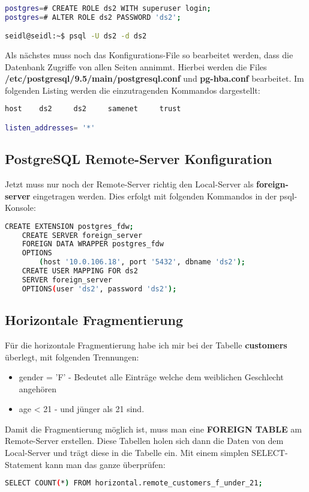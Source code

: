 \begin{lstlisting}[language=bash,caption={User, Rechte anlegen}]

postgres=# CREATE ROLE ds2 WITH superuser login;
postgres=# ALTER ROLE ds2 PASSWORD 'ds2';

seidl@seidl:~$ psql -U ds2 -d ds2
\end{lstlisting}

\newpage
Als nächstes muss noch das Konfigurations-File so bearbeitet werden, dass die Datenbank Zugriffe von allen Seiten annimmt.
Hierbei werden die Files \textbf{/etc/postgresql/9.5/main/postgresql.conf} und \textbf{pg-hba.conf} bearbeitet.
Im folgenden Listing werden die einzutragenden Kommandos dargestellt:
\begin{lstlisting}[language=bash,caption={PostgreSQL Konfiguration}]
host	ds2		ds2		samenet		trust

listen_addresses= '*'
\end{lstlisting}

\subsection{PostgreSQL Remote-Server Konfiguration}
Jetzt muss nur noch der Remote-Server richtig den Local-Server als \textbf{foreign-server} eingetragen werden. Dies erfolgt mit folgenden Kommandos in der psql-Konsole:
\begin{lstlisting}[language=bash,caption={Remote-Server Konfiguration}]
	CREATE EXTENSION postgres_fdw;
	CREATE SERVER foreign_server
	FOREIGN DATA WRAPPER postgres_fdw
	OPTIONS
		(host '10.0.106.18', port '5432', dbname 'ds2');
	CREATE USER MAPPING FOR ds2
	SERVER foreign_server
	OPTIONS(user 'ds2', password 'ds2');
\end{lstlisting}

\subsection{Horizontale Fragmentierung}

Für die horizontale Fragmentierung habe ich mir bei der Tabelle \textbf{customers} überlegt, mit folgenden Trennungen:
\begin{itemize}
	\item gender = 'F' - Bedeutet alle Einträge welche dem weiblichen Geschlecht angehören
	\item age < 21 - und jünger als 21 sind.
\end{itemize}

Damit die Fragmentierung möglich ist, muss man eine \textbf{FOREIGN TABLE} am Remote-Server erstellen.
Diese Tabellen holen sich dann die Daten von dem Local-Server und trägt diese in die Tabelle ein.
Mit einem simplen SELECT-Statement kann man das ganze überprüfen:
\begin{lstlisting}[language=bash,caption={Horizontale Fragmentierung}]
SELECT COUNT(*) FROM horizontal.remote_customers_f_under_21;
\end{lstlisting}
\newpage
